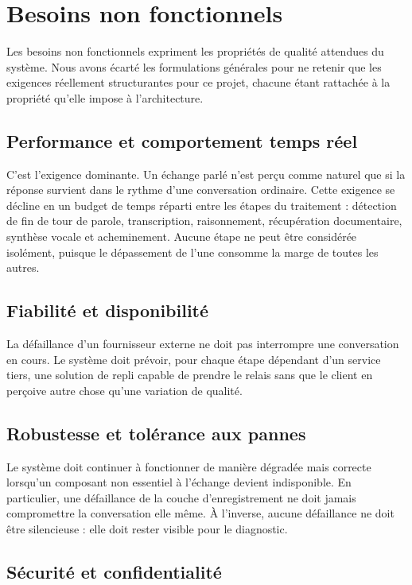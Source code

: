 \section{Besoins non fonctionnels}

Les besoins non fonctionnels expriment les propriétés de qualité attendues du système. Nous avons écarté les formulations générales pour ne retenir que les exigences réellement structurantes pour ce projet, chacune étant rattachée à la propriété qu'elle impose à l'architecture.

\subsection{Performance et comportement temps réel}

C'est l'exigence dominante. Un échange parlé n'est perçu comme naturel que si la réponse survient dans le rythme d'une conversation ordinaire. Cette exigence se décline en un budget de temps réparti entre les étapes du traitement : détection de fin de tour de parole, transcription, raisonnement, récupération documentaire, synthèse vocale et acheminement. Aucune étape ne peut être considérée isolément, puisque le dépassement de l'une consomme la marge de toutes les autres.

\subsection{Fiabilité et disponibilité}

La défaillance d'un fournisseur externe ne doit pas interrompre une conversation en cours. Le système doit prévoir, pour chaque étape dépendant d'un service tiers, une solution de repli capable de prendre le relais sans que le client en perçoive autre chose qu'une variation de qualité.

\subsection{Robustesse et tolérance aux pannes}

Le système doit continuer à fonctionner de manière dégradée mais correcte lorsqu'un composant non essentiel à l'échange devient indisponible. En particulier, une défaillance de la couche d'enregistrement ne doit jamais compromettre la conversation elle même. À l'inverse, aucune défaillance ne doit être silencieuse : elle doit rester visible pour le diagnostic.

\subsection{Sécurité et confidentialité}

